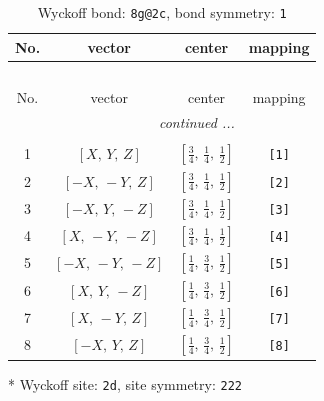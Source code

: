 \documentclass[fleqn,8pt]{jsarticle}
\begin{document}
\renewcommand{\arraystretch}{1.2}
\begin{longtable}{cccc}
\caption{Wyckoff bond: {\tt 8g@2c}, bond symmetry: {\tt 1}}
 \\
 \hline \hline
No. & vector & center & mapping \\ \hline \endfirsthead

\multicolumn{3}{l}{\tablename\ \thetable{}} \\
 \hline \hline
No. & vector & center & mapping \\ \hline \endhead

 \hline \hline
\multicolumn{3}{r}{\footnotesize\it continued ...} \\ \endfoot

 \hline \hline
\multicolumn{3}{r}{} \\ \endlastfoot

1 & $\left[ X,\, Y,\, Z \right]$ & $\left[ \frac{3}{4},\, \frac{1}{4},\, \frac{1}{2} \right]$ & {\tt [1]} \\ \hline
2 & $\left[ - X,\, - Y,\, Z \right]$ & $\left[ \frac{3}{4},\, \frac{1}{4},\, \frac{1}{2} \right]$ & {\tt [2]} \\ \hline
3 & $\left[ - X,\, Y,\, - Z \right]$ & $\left[ \frac{3}{4},\, \frac{1}{4},\, \frac{1}{2} \right]$ & {\tt [3]} \\ \hline
4 & $\left[ X,\, - Y,\, - Z \right]$ & $\left[ \frac{3}{4},\, \frac{1}{4},\, \frac{1}{2} \right]$ & {\tt [4]} \\ \hline
5 & $\left[ - X,\, - Y,\, - Z \right]$ & $\left[ \frac{1}{4},\, \frac{3}{4},\, \frac{1}{2} \right]$ & {\tt [5]} \\ \hline
6 & $\left[ X,\, Y,\, - Z \right]$ & $\left[ \frac{1}{4},\, \frac{3}{4},\, \frac{1}{2} \right]$ & {\tt [6]} \\ \hline
7 & $\left[ X,\, - Y,\, Z \right]$ & $\left[ \frac{1}{4},\, \frac{3}{4},\, \frac{1}{2} \right]$ & {\tt [7]} \\ \hline
8 & $\left[ - X,\, Y,\, Z \right]$ & $\left[ \frac{1}{4},\, \frac{3}{4},\, \frac{1}{2} \right]$ & {\tt [8]} \\
\end{longtable}
* Wyckoff site: {\tt 2d}, site symmetry: {\tt 222}
\renewcommand{\arraystretch}{1.2}
\end{document}
